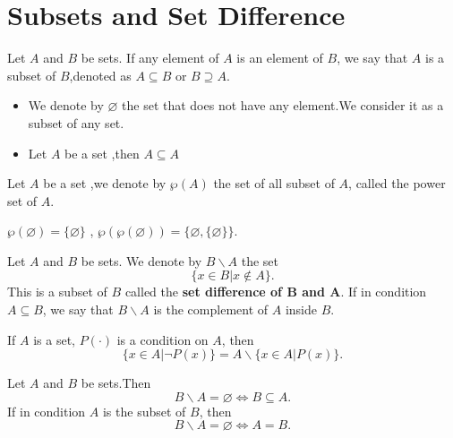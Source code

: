 \documentclass{book}
\numberwithin{equation}{section}
\begin{document}
\section{Subsets and Set Difference}
\begin{definitionenv}
    Let $A$ and $B$ be sets. If any element of $A$ is an element of $B$, we say that $A$ is a subset of $B$,denoted as $A \subseteq B$ or $B\supseteq  A$.
\end{definitionenv}
\begin{exampleenv}
    \quad
   \begin{itemize}
    \item  We denote by $\varnothing $ the set that does not have any element.We consider it as a subset of any set.
   \item  Let $A$ be a set ,then $A\subseteq A$
    \end{itemize}
\end{exampleenv}
\begin{definitionenv}
    Let $A$ be a set ,we denote by $\wp  (A)$ the set of all subset of $A$, called the power set of $A$.
\end{definitionenv}
\begin{exampleenv}
    $\wp (\varnothing)=\{\varnothing\}$
    ,
    $\wp (\wp (\varnothing))=\{\varnothing,\{\varnothing\}\}$.
\end{exampleenv}
\begin{definitionenv}
    Let $A$ and $B$ be sets. We denote by $B \backslash A$ the set $$\{x\in B|x\notin A\}.$$ This is a subset of $B$ called the \textbf{set difference of $\mathbf{B}$ and $\mathbf{A}$}.
    \newline
    If in condition $A \subseteq B$, we say that $B\backslash A$ is the complement of $A$ inside $B$.
\end{definitionenv}
\begin{exampleenv}
    If $A$ is a set, $P(\cdot)$ is  a condition on $A$, then $$\{x\in A |\neg P(x)\}=A\backslash\{x\in A|P(x)\}.$$
\end{exampleenv}
\begin{propositionenv}
    Let $A$ and $B$ be sets.Then $$B\backslash A=\varnothing \Leftrightarrow B\subseteq A.$$
    If in condition $A$ is the subset of $B$, then $$B\backslash A=\varnothing \Leftrightarrow A=B.$$
\end{propositionenv}
\end{document}

